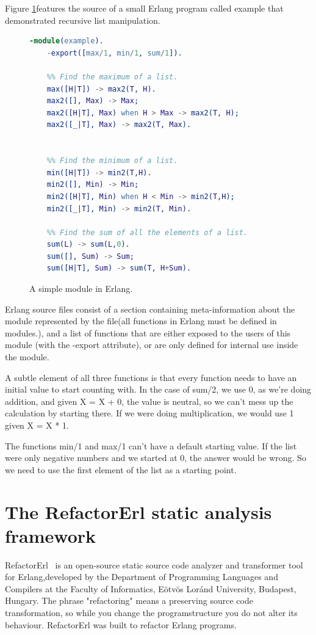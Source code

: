Figure \ref{fig:example_erlang}features the source of a small Erlang program
called example that demonstrated recursive list manipulation.
\begin{figure}[h]
	\begin{lstlisting}[extendedchars=true, language=Erlang, basicstyle=\footnotesize\ttfamily, keywordstyle=\color{red}]
	-module(example). 
	-export([max/1, min/1, sum/1]).
	
	%% Find the maximum of a list.
	max([H|T]) -> max2(T, H).
	max2([], Max) -> Max;
	max2([H|T], Max) when H > Max -> max2(T, H);
	max2([_|T], Max) -> max2(T, Max).
	

	%% Find the minimum of a list.
	min([H|T]) -> min2(T,H).
	min2([], Min) -> Min;
	min2([H|T], Min) when H < Min -> min2(T,H);
	min2([_|T], Min) -> min2(T, Min).
	
	%% Find the sum of all the elements of a list.
	sum(L) -> sum(L,0).
	sum([], Sum) -> Sum;
	sum([H|T], Sum) -> sum(T, H+Sum).
	\end{lstlisting}
\caption{A simple module in Erlang.}
\label{fig:example_erlang}
\end{figure}

Erlang source files consist of a section containing meta-information about the module represented by the file(all functions in Erlang must be defined in
modules.), and a list of functions that are either exposed to the users of this module (with the -export attribute), or are only defined for internal use inside the module.  

A subtle element of all three functions is that every function needs to 
have an initial value to start counting with. In the case of 
sum/2, we use 0, as we’re doing addition, and given X = X + 0, the value is neutral, so we can’t mess up the calculation by starting there. If we were doing multiplication, we would use 1 given X = X * 1. 

The functions min/1 and max/1 can’t have a default starting value. If the 
list were only negative numbers and we started at 0, the answer would be 
wrong. So we need to use the first element of the list as a starting point.

\section{The RefactorErl static analysis framework} 

RefactorErl~\cite{refactorerl1, refactorerl2} is an open-source static source code analyzer and transformer tool for Erlang,developed by the Department of Programming Languages and Compilers at the Faculty of Informatics, Eötvös Loránd University, Budapest, Hungary. The phrase "refactoring" means a preserving source code transformation, so while you change the programstructure you do not alter its behaviour. RefactorErl was built to refactor Erlang programs.

